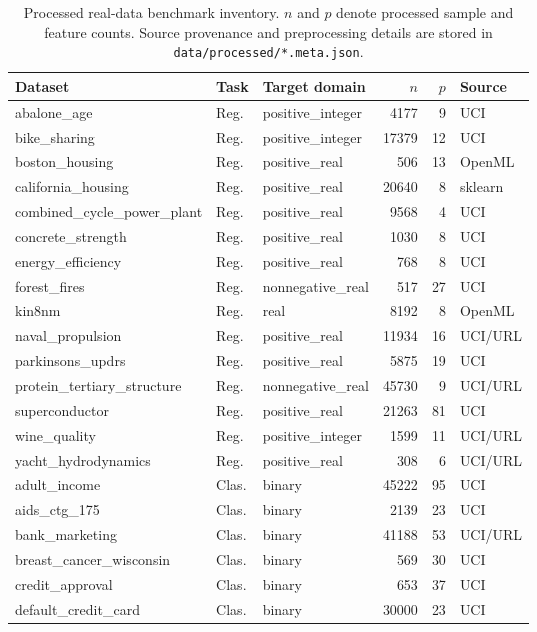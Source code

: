\begin{landscape}
\begin{table}[!p]
\centering
\caption{Processed real-data benchmark inventory. $n$ and $p$ denote processed sample and feature counts. Source provenance and preprocessing details are stored in \texttt{data/processed/*.meta.json}.}
\label{tab:dataset-inventory}
\small
\begin{tabular}{lllrrl}
\toprule
Dataset & Task & Target domain & $n$ & $p$ & Source \\
\midrule
abalone\_age & Reg. & positive\_integer & 4177 & 9 & UCI \\
bike\_sharing & Reg. & positive\_integer & 17379 & 12 & UCI \\
boston\_housing & Reg. & positive\_real & 506 & 13 & OpenML \\
california\_housing & Reg. & positive\_real & 20640 & 8 & sklearn \\
combined\_cycle\_power\_plant & Reg. & positive\_real & 9568 & 4 & UCI \\
concrete\_strength & Reg. & positive\_real & 1030 & 8 & UCI \\
energy\_efficiency & Reg. & positive\_real & 768 & 8 & UCI \\
forest\_fires & Reg. & nonnegative\_real & 517 & 27 & UCI \\
kin8nm & Reg. & real & 8192 & 8 & OpenML \\
naval\_propulsion & Reg. & positive\_real & 11934 & 16 & UCI/URL \\
parkinsons\_updrs & Reg. & positive\_real & 5875 & 19 & UCI \\
protein\_tertiary\_structure & Reg. & nonnegative\_real & 45730 & 9 & UCI/URL \\
superconductor & Reg. & positive\_real & 21263 & 81 & UCI \\
wine\_quality & Reg. & positive\_integer & 1599 & 11 & UCI/URL \\
yacht\_hydrodynamics & Reg. & positive\_real & 308 & 6 & UCI/URL \\
adult\_income & Clas. & binary & 45222 & 95 & UCI \\
aids\_ctg\_175 & Clas. & binary & 2139 & 23 & UCI \\
bank\_marketing & Clas. & binary & 41188 & 53 & UCI/URL \\
breast\_cancer\_wisconsin & Clas. & binary & 569 & 30 & UCI \\
credit\_approval & Clas. & binary & 653 & 37 & UCI \\
default\_credit\_card & Clas. & binary & 30000 & 23 & UCI \\

\end{tabular}
\end{table}
\end{landscape}
